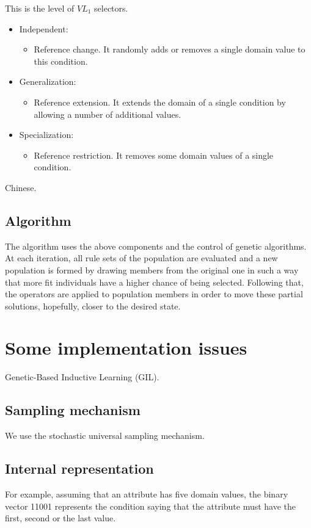 \documentclass[12pt]{book}
\newcounter{subsubsubsection}[subsubsection]
\begin{document}
This is the level of $VL_1$ selectors.
\begin{itemize}
\item Independent:
\begin{itemize}
\item Reference change. It randomly adds or removes a single domain value to this condition.
\end{itemize}
\item Generalization:
\begin{itemize}
\item Reference extension. It extends the domain of a single condition by allowing a number of additional values.
\end{itemize}
\item Specialization:
\begin{itemize}
\item Reference restriction. It removes some domain values of a single condition.
\end{itemize}
\end{itemize}

Chinese.

\subsection{Algorithm}
The algorithm uses the above components and the control of genetic algorithms. At each iteration, all rule sets of the population are evaluated and a new population is formed by drawing members from the original one in such a way that more fit individuals have a higher chance of being selected. Following that, the operators are applied to population members in order to move these partial solutions, hopefully, closer to the desired state.

\section{Some implementation issues}
Genetic-Based Inductive Learning (GIL).

\subsection{Sampling mechanism}
We use the stochastic universal sampling mechanism.

\subsection{Internal representation}
For example, assuming that an attribute has five domain values, the binary vector 11001 represents the condition saying that the attribute must have the first, second or the last value.
\end{document}
